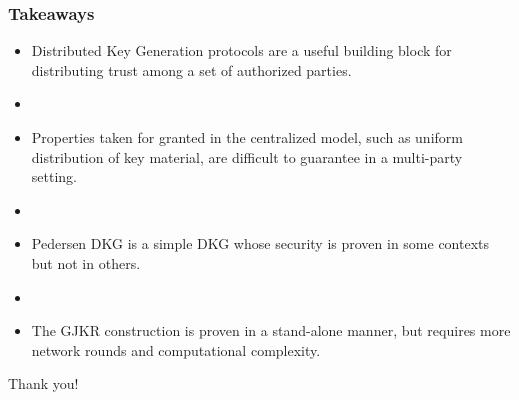 \documentclass[hyperref={pdfpagelabels=true},table,dvipsnames,14pt,aspectratio=169]{beamer}
\begin{document}
\begin{frame}
  \frametitle{Takeaways}

  \begin{itemize}
    \item Distributed Key Generation protocols are a useful building block for distributing trust among a set of authorized parties.
    \item[]
    \item<2-> Properties taken for granted in the centralized model, such as uniform distribution of key material, are difficult to guarantee in a multi-party setting.
    \item[]
    \item<3-> Pedersen DKG is a simple DKG whose security is proven in some contexts but not in others.
    \item[]
    \item<4-> The GJKR construction is proven in a stand-alone manner, but requires more network rounds and computational complexity.
  \end{itemize}
\end{frame}

\begin{frame}

  \huge
  \centering
  Thank you!
\end{frame}
\end{document}
